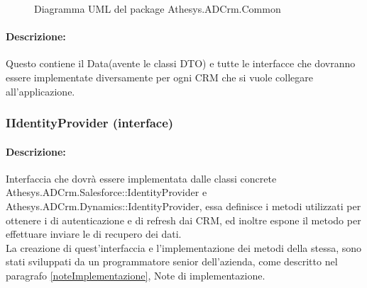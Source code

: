 	\begin{figure}[H]
		\centering
		
		\caption{Diagramma UML del package Athesys.ADCrm.Common}
		\label{fig:common}
	\end{figure}


\newpage
\paragraph{Descrizione:}
Questo  contiene il  Data(avente le classi \gls{DTO}) e tutte le interfacce che dovranno essere implementate diversamente per ogni CRM che si vuole collegare all'applicazione. 

\subsubsection{IIdentityProvider (interface)}

\paragraph{Descrizione:}
Interfaccia che dovrà essere implementata dalle classi concrete Athesys.ADCrm.Salesforce::IdentityProvider e\\ Athesys.ADCrm.Dynamics::IdentityProvider, essa definisce i metodi utilizzati per ottenere i  di autenticazione e di refresh dai CRM, ed inoltre espone il metodo per effettuare inviare le  di recupero dei dati.\\
La creazione di quest'interfaccia e l'implementazione dei metodi della stessa, sono stati sviluppati da un programmatore senior dell'azienda, come descritto nel paragrafo \ref{noteImplementazione}, Note di implementazione.
